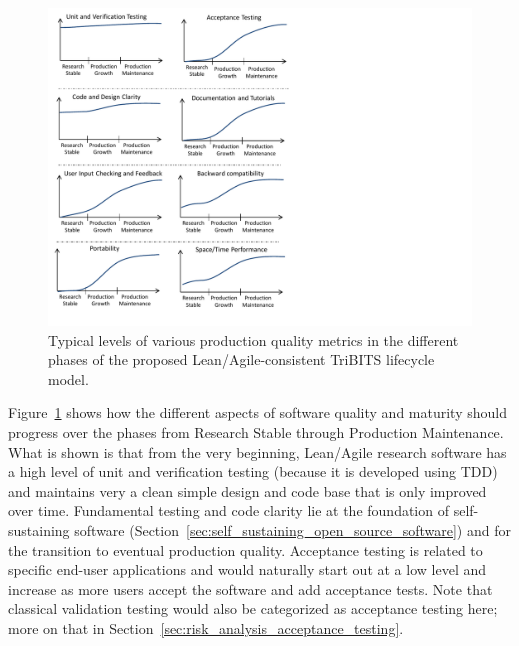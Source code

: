 \documentclass[11pt]{SANDreport}
\begin{document}
\begin{figure}
\begin{center}
\includegraphics[trim = 0.1in 0.1in 4.0in 0.1in, scale=0.85]
{ImprovementsInDevelopmentPhases}
{}\caption{Typical levels of various production quality metrics in the different phases of the proposed Lean/Agile-consistent TriBITS lifecycle model.}
\label{fig:ImprovementsInDevelopmentPhases}
\end{center}
\end{figure}

Figure~\ref{fig:ImprovementsInDevelopmentPhases} shows how the different aspects of software quality and maturity should progress over the phases from Research Stable through Production Maintenance.  What is shown is that from the very beginning, Lean/Agile research software has a high level of unit and verification testing (because it is developed using TDD) and maintains very a clean simple design and code base that is only improved over time. Fundamental testing and code clarity lie at the foundation of self-sustaining software (Section~\ref{sec:self_sustaining_open_source_software}) and for the transition to eventual production quality.  Acceptance testing is related to specific end-user applications and would naturally start out at a low level and increase as more users accept the software and add acceptance tests.  Note that classical validation testing would also be categorized as acceptance testing here; more on that in Section~\ref{sec:risk_analysis_acceptance_testing}.
\end{document}
